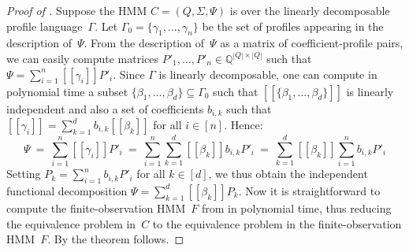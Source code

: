 \documentclass[a4paper,UKenglish,cleveref, autoref,mathscr, amsthm, thmtools, thm-restate]{lipics-v2019}
\newcommand{\QQ}{\mathbb{Q}}
\newcommand{\1}{\mathbb{I}}
\begin{document}
\begin{proof}[Proof of ]
Suppose the HMM $C=(Q, \Sigma, \Psi)$ is over the linearly decomposable profile language~$\Gamma$.
Let $\Gamma_0 = \{\gamma_1, \ldots, \gamma_n\}$ be the set of profiles appearing in the description of~$\Psi$.
From the description of~$\Psi$ as a matrix of coefficient-profile pairs, we can easily compute matrices $P'_1, \dots, P'_n \in \QQ^{|Q| \times |Q|}$ such that $\Psi = \sum_{i=1}^n [\![\gamma_i]\!] P'_i$.
Since $\Gamma$ is linearly decomposable, one can compute in polynomial time a subset $\{\beta_1, \dots, \beta_d\} \subseteq \Gamma_0$ such that $[\![\{\beta_1, \dots, \beta_d\}]\!]$ is linearly independent and also a set of coefficients $b_{i,k}$ such that $[\![\gamma_i]\!] = \sum_{k = 1}^d b_{i,k} [\![\beta_k]\!]$ for all $i \in [n]$.
Hence:
\[
\Psi
\ = \ \sum_{i=1}^n [\![\gamma_i]\!] P'_i
\ = \ \sum_{i=1}^n \sum_{k=1}^d [\![\beta_k]\!] b_{i,k} P'_i
\ = \ \sum_{k=1}^d [\![\beta_k]\!] \sum_{i=1}^n b_{i,k} P'_i
\]
Setting $P_k = \sum_{i=1}^n b_{i,k} P'_i$ for all $k \in [d]$, we thus obtain the independent functional decomposition $\Psi = \sum_{k=1}^d [\![\beta_k]\!] P_k$.
Now it is straightforward to compute the finite-observation HMM~$F$ from  in polynomial time, thus reducing the equivalence problem in~$C$ to the equivalence problem in the finite-observation HMM~$F$.
By  the theorem follows.
\end{proof}
\end{document}
